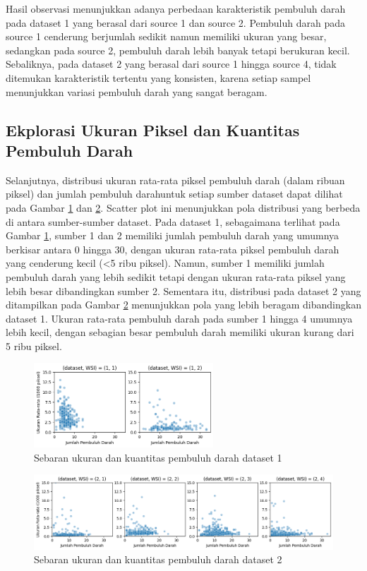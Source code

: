 \noindent Hasil observasi menunjukkan adanya perbedaan karakteristik pembuluh darah pada dataset 1 yang berasal dari source 1 dan source 2. Pembuluh darah pada source 1 cenderung berjumlah sedikit namun memiliki ukuran yang besar, sedangkan pada source 2, pembuluh darah lebih banyak tetapi berukuran kecil. Sebaliknya, pada dataset 2 yang berasal dari source 1 hingga source 4, tidak ditemukan karakteristik tertentu yang konsisten, karena setiap sampel menunjukkan variasi pembuluh darah yang sangat beragam.

\subsection{Ekplorasi Ukuran Piksel dan Kuantitas Pembuluh Darah}

\noindent Selanjutnya, distribusi ukuran rata-rata piksel pembuluh darah (dalam ribuan piksel) dan jumlah pembuluh darahuntuk setiap sumber dataset dapat dilihat pada Gambar \ref{fig:sct_1} dan \ref{fig:sct_2}. Scatter plot ini menunjukkan pola distribusi yang berbeda di antara sumber-sumber dataset. Pada dataset 1, sebagaimana terlihat pada Gambar \ref{fig:sct_1}, sumber 1 dan 2 memiliki jumlah pembuluh darah yang umumnya berkisar antara 0 hingga 30, dengan ukuran rata-rata piksel pembuluh darah yang cenderung kecil (<5 ribu piksel). Namun, sumber 1 memiliki jumlah pembuluh darah yang lebih sedikit tetapi dengan ukuran rata-rata piksel yang lebih besar dibandingkan sumber 2. Sementara itu, distribusi pada dataset 2 yang ditampilkan pada Gambar \ref{fig:sct_2} menunjukkan pola yang lebih beragam dibandingkan dataset 1. Ukuran rata-rata pembuluh darah pada sumber 1 hingga 4 umumnya lebih kecil, dengan sebagian besar pembuluh darah memiliki ukuran kurang dari 5 ribu piksel.

\begin{figure}[H]
	\centering
	\includegraphics[width=0.6\textwidth]{gambar/bab4/sct_1.png}
	\caption{Sebaran ukuran dan kuantitas pembuluh darah dataset 1}
	\label{fig:sct_1}
\end{figure}

\begin{figure}[h]
	\centering
	\includegraphics[width=\textwidth]{gambar/bab4/sct_2.png}
	\caption{Sebaran ukuran dan kuantitas pembuluh darah dataset 2}
	\label{fig:sct_2}
\end{figure}


